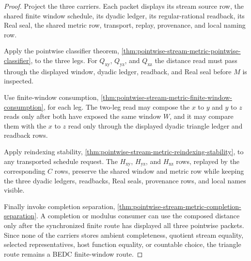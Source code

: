 \begin{proof}
Project the three carriers. Each packet displays its stream source row, the shared finite window schedule, its dyadic ledger, its regular-rational readback, its Real seal, the shared metric row, transport, replay, provenance, and local naming row.

Apply the pointwise classifier theorem, \autoref{thm:pointwise-stream-metric-pointwise-classifier}, to the three legs. For $Q_{\mathrm{xy}}$, $Q_{\mathrm{yz}}$, and $Q_{\mathrm{xz}}$ the distance read must pass through the displayed window, dyadic ledger, readback, and Real seal before $M$ is inspected.

Use finite-window consumption, \autoref{thm:pointwise-stream-metric-finite-window-consumption}, for each leg. The two-leg read may compose the $x$ to $y$ and $y$ to $z$ reads only after both have exposed the same window $W$, and it may compare them with the $x$ to $z$ read only through the displayed dyadic triangle ledger and readback rows.

Apply reindexing stability, \autoref{thm:pointwise-stream-metric-reindexing-stability}, to any transported schedule request. The $H_{\mathrm{xy}}$, $H_{\mathrm{yz}}$, and $H_{\mathrm{xz}}$ rows, replayed by the corresponding $C$ rows, preserve the shared window and metric row while keeping the three dyadic ledgers, readbacks, Real seals, provenance rows, and local names visible.

Finally invoke completion separation, \autoref{thm:pointwise-stream-metric-completion-separation}. A completion or modulus consumer can use the composed distance only after the synchronized finite route has displayed all three pointwise packets. Since none of the carriers stores ambient completeness, quotient stream equality, selected representatives, host function equality, or countable choice, the triangle route remains a BEDC finite-window route.
\end{proof}

